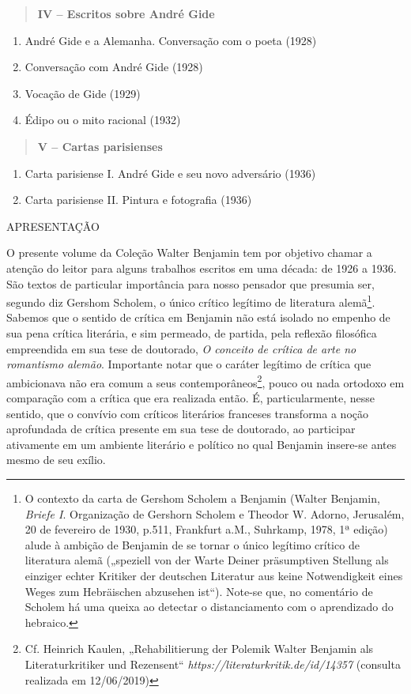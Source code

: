 \begin{quote}
\textbf{IV -- Escritos sobre André Gide}
\end{quote}

\begin{enumerate}
\def\labelenumi{\arabic{enumi}.}
\setcounter{enumi}{9}
\item
  André Gide e a Alemanha. Conversação com o poeta (1928)
\item
  Conversação com André Gide (1928)
\item
  Vocação de Gide (1929)
\item
  Édipo ou o mito racional (1932)
\end{enumerate}

\begin{quote}
\textbf{V -- Cartas parisienses}
\end{quote}

\begin{enumerate}
\def\labelenumi{\arabic{enumi}.}
\setcounter{enumi}{13}
\item
  Carta parisiense I. André Gide e seu novo adversário (1936)
\item
  Carta parisiense II. Pintura e fotografia (1936)
\end{enumerate}

APRESENTAÇÃO

O presente volume da Coleção Walter Benjamin tem por objetivo chamar a
atenção do leitor para alguns trabalhos escritos em uma década: de 1926
a 1936. São textos de particular importância para nosso pensador que
presumia ser, segundo diz Gershom Scholem, o único crítico legítimo de
literatura alemã\footnote{O contexto da carta de Gershom Scholem a
  Benjamin (Walter Benjamin, \emph{Briefe I}. Organização de Gershorn
  Scholem e Theodor W. Adorno, Jerusalém, 20 de fevereiro de 1930,
  p.511, Frankfurt a.M., Suhrkamp, 1978, 1ª edição) alude à ambição de
  Benjamin de se tornar o único legítimo crítico de literatura alemã
  („speziell von der Warte Deiner präsumptiven Stellung als einziger
  echter Kritiker der deutschen Literatur aus keine Notwendigkeit eines
  Weges zum Hebräischen abzusehen ist``). Note-se que, no comentário de
  Scholem há uma queixa ao detectar o distanciamento com o aprendizado
  do hebraico.}. Sabemos que o sentido de crítica em Benjamin não está
isolado no empenho de sua pena crítica literária, e sim permeado, de
partida, pela reflexão filosófica empreendida em sua tese de doutorado,
\emph{O conceito de crítica de arte no romantismo alemão}. Importante
notar que o caráter legítimo de crítica que ambicionava não era comum a
seus contemporâneos\footnote{Cf. Heinrich Kaulen, „Rehabilitierung der
  Polemik Walter Benjamin als Literaturkritiker und Rezensent``
  \emph{https://literaturkritik.de/id/14357} (consulta realizada em
  12/06/2019)}, pouco ou nada ortodoxo em comparação com a crítica que
era realizada então. É, particularmente, nesse sentido, que o convívio
com críticos literários franceses transforma a noção aprofundada de
crítica presente em sua tese de doutorado, ao participar ativamente em
um ambiente literário e político no qual Benjamin insere-se antes mesmo
de seu exílio.

